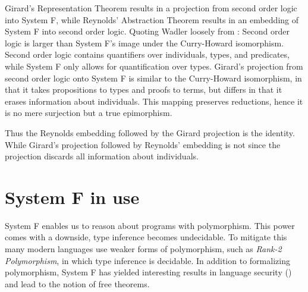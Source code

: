 Girard's Representation Theorem results in a projection from second order logic into System F, while Reynolds' Abstraction Theorem results in an embedding of System F into second order logic.  Quoting Wadler loosely from \cite{Wadlergirard}: Second order logic is larger than System F's image under the Curry-Howard isomorphism. Second order logic contains quantifiers over individuals, types, and predicates, while System F only allows for quantification over types. Girard's projection from second order logic onto System F is similar to the Curry-Howard isomorphism, in that it takes propositions to types and proofs to terms, but differs in that it erases information about individuals. This mapping preserves reductions, hence it is no mere surjection but a true epimorphism.

Thus the Reynolds embedding followed by the Girard projection is the identity. While Girard's projection followed by Reynolds' embedding is not since the projection discards all information about individuals.

\section{System F in use}
System F enables us to reason about programs with polymorphism. This power comes with a downside, type inference becomes undecidable. To mitigate this many modern languages use weaker forms of polymorphism, such as \emph{Rank-2 Polymorphism}, in which type inference is decidable. In addition to formalizing polymorphism, System F has yielded interesting results in language security (\cite{infoFlow}) and lead to the notion of free theorems.
